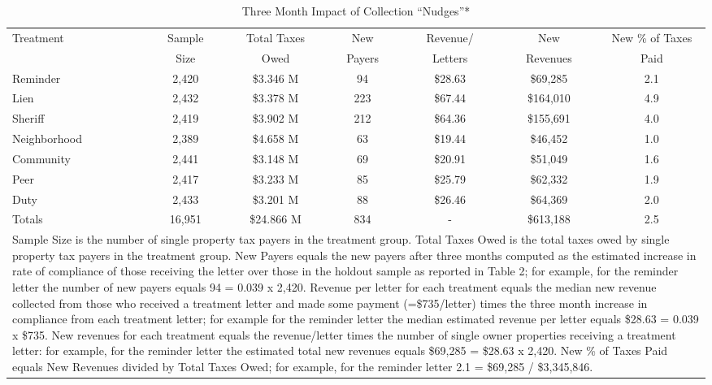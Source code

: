 \documentclass[12pt]{article}
\begin{document}
\begin{table}[htbp]
\centering
\caption{Three Month Impact of Collection ``Nudges''*}
\label{sh_rev}
\begin{tabular}{lcccccc}
  \hline
Treatment & Sample & Total Taxes & New & Revenue/ & New & New \% of Taxes \\
 & Size & Owed & Payers & Letters & Revenues & Paid \\
  \hline
Reminder & 2,420 & \$3.346 M & 94 & \$28.63 & \$69,285 & 2.1 \\
  Lien & 2,432 & \$3.378 M & 223 & \$67.44 & \$164,010 & 4.9 \\
  Sheriff & 2,419 & \$3.902 M & 212 & \$64.36 & \$155,691 & 4.0 \\
  Neighborhood & 2,389 & \$4.658 M & 63 & \$19.44 & \$46,452 & 1.0 \\
  Community & 2,441 & \$3.148 M & 69 & \$20.91 & \$51,049 & 1.6 \\
  Peer & 2,417 & \$3.233 M & 85 & \$25.79 & \$62,332 & 1.9 \\
  Duty & 2,433 & \$3.201 M & 88 & \$26.46 & \$64,369 & 2.0 \\
   \hline
Totals & 16,951 & \$24.866 M & 834 & - & \$613,188 & 2.5 \\
   \hline
\multicolumn{7}{p{1\textwidth}}{\scriptsize* Sample Size is the number of single property tax payers in the treatment group.  Total Taxes Owed is the total taxes owed by single property tax payers in the treatment group. New Payers equals the new payers after three months computed as the estimated increase in rate of compliance of those receiving the letter over those in the holdout sample as reported in Table 2; for example, for the reminder letter the number of new payers equals 94 = 0.039 x 2,420.  Revenue per letter for each treatment equals the median new revenue collected from those who received a treatment letter and made some payment (=\$735/letter) times the three month increase in compliance from each treatment letter; for example for the reminder letter the median estimated revenue per letter equals \$28.63 = 0.039 x \$735.  New revenues for each treatment equals the revenue/letter times the number of single owner properties receiving a treatment letter: for example, for the reminder letter the estimated total new revenues equals \$69,285 = \$28.63 x 2,420.  New \% of Taxes Paid equals New Revenues divided by Total Taxes Owed; for example, for the reminder letter 2.1 = \$69,285 / \$3,345,846.}
\end{tabular}
\end{table}
\end{document}
